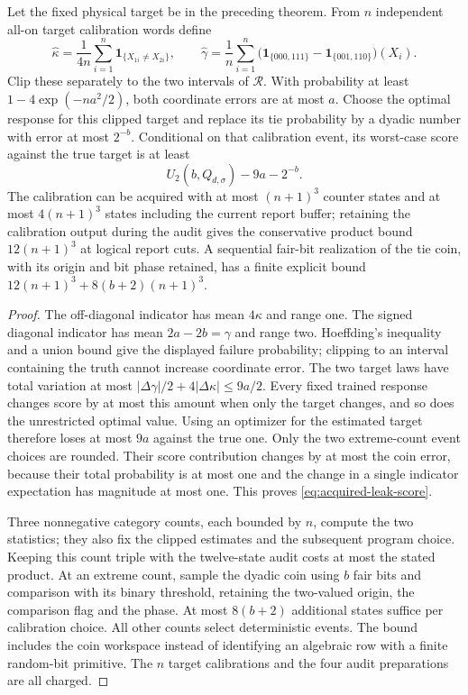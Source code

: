 \begin{proposition}
\label{prop:physical-acquisition}
Let the fixed physical target be in the preceding theorem. From $n$
independent all-on target calibration words define
\[
 \widehat\kappa=\frac1{4n}\sum_{i=1}^n\mathbf1_{\{X_{1i}\ne X_{2i}\}},
 \qquad
 \widehat\gamma=\frac1n\sum_{i=1}^n
 \bigl(\mathbf1_{\{000,111\}}-\mathbf1_{\{001,110\}}\bigr)(X_i).
\]
Clip these separately to the two intervals of $\mathcal R$.
With probability at least $1-4\exp(-na^2/2)$, both coordinate errors
are at most $a$. Choose the optimal response for this clipped target
and replace its tie probability by a dyadic number with error at most
$2^{-b}$. Conditional on that calibration event, its worst-case score
against the true target is at least
\begin{equation}\label{eq:acquired-leak-score}
 U_2(b,Q_{d,\sigma})-9a-2^{-b}.
\end{equation}
The calibration can be acquired with at most $(n+1)^3$ counter states and at most
$4(n+1)^3$ states including the current report buffer;
retaining the calibration output during the audit gives the conservative
product bound $12(n+1)^3$ at logical report cuts. A sequential fair-bit
realization of the tie coin, with its origin and bit phase retained,
has a finite explicit bound $12(n+1)^3+8(b+2)(n+1)^3$.
\end{proposition}
\begin{proof}
The off-diagonal indicator has mean $4\kappa$ and range one. The signed
diagonal indicator has mean $2a-2b=\gamma$ and range two.
Hoeffding's inequality and a union bound give the displayed failure
probability; clipping to an interval containing the truth cannot
increase coordinate error. The two target laws have total variation
at most $|\Delta\gamma|/2+4|\Delta\kappa|\le9a/2$.
Every fixed trained response changes score by at most this amount when
only the target changes, and so does the unrestricted optimal value.
Using an optimizer for the estimated target therefore loses at most
$9a$ against the true one. Only the two extreme-count event choices
are rounded. Their score contribution changes by at most the coin
error, because their total probability is at most one and the change
in a single indicator expectation has magnitude at most one. This
proves \eqref{eq:acquired-leak-score}.

Three nonnegative category counts, each bounded by $n$, compute the
two statistics; they also fix the clipped estimates and the subsequent
program choice. Keeping this count triple with the twelve-state audit
costs at most the stated product. At an extreme count, sample the
dyadic coin using $b$ fair bits and comparison with its binary threshold,
retaining the two-valued origin, the comparison flag and the phase.
At most $8(b+2)$ additional states suffice per calibration choice.
All other counts select deterministic events. The bound includes the
coin workspace instead of identifying an algebraic row with a finite
random-bit primitive. The $n$ target calibrations and the four audit
preparations are all charged.
\end{proof}
